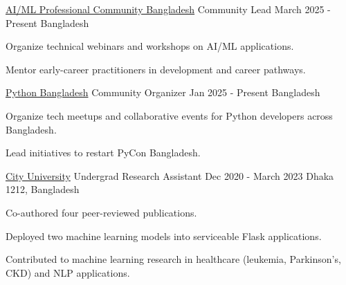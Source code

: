 


\begin{cventries}
\cventry
    {\href{https://aimlcommunity.pythonbd.org/}{AI/ML Professional Community Bangladesh}} %
    {Community Lead} %
    {March 2025 - Present} %
    {Bangladesh} %
    {
      \begin{cvitems} %
        \item{Organize technical webinars and workshops on AI/ML applications.}
        \item{Mentor early-career practitioners in development and career pathways.}
      \end{cvitems}
    }

  \cventry
    {\href{https://pythonbd.org/}{Python Bangladesh}} %
    {Community Organizer} %
    {Jan 2025 - Present} %
    {Bangladesh} %
    {
      \begin{cvitems} %
        \item{Organize tech meetups and collaborative events for Python developers across Bangladesh.}
        \item{Lead initiatives to restart PyCon Bangladesh.}
      \end{cvitems}
    }

  \cventry
    {\href{https://cityuniversity.edu.bd}{City University}} %
    {Undergrad Research Assistant} %
    {Dec 2020 - March 2023} %
    {Dhaka 1212, Bangladesh} %
    {
      \begin{cvitems} %
        \item{Co-authored four peer-reviewed publications.}
        \item{Deployed two machine learning models into serviceable Flask applications.}
        \item{Contributed to machine learning research in healthcare (leukemia, Parkinson's, CKD) and NLP applications.}
      \end{cvitems}
    }


\end{cventries}
